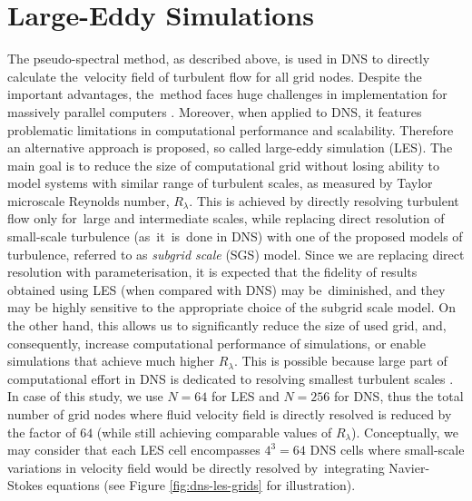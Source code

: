 \documentclass{pracamgren}
\begin{document}
\section{Large-Eddy Simulations}
\label{sc:ch1.les}

The pseudo-spectral method, as described above, is used in DNS to directly calculate the~velocity field of turbulent flow for all grid nodes.
Despite the important advantages, the~method faces huge challenges in implementation for massively parallel computers \parencite{Onishi2013}. 
Moreover, when applied to DNS, it features problematic limitations in computational performance and scalability. 
Therefore an alternative approach is proposed, so called large-eddy simulation (LES). 
The main goal is to reduce the size of computational grid without losing ability to model systems with similar range of turbulent scales, as measured by Taylor microscale Reynolds number, $R_{\lambda}$.
This is achieved by directly resolving turbulent flow only for~large and intermediate scales, while replacing direct resolution of small-scale turbulence (as~it~is~done in DNS) with one of the proposed models of turbulence, referred to as \emph{subgrid scale} (SGS) model.
Since we are replacing direct resolution with parameterisation, it is expected that the fidelity of results obtained using LES (when compared with DNS) may be~diminished, and they may be highly sensitive to the appropriate choice of the subgrid scale model.
On the other hand, this allows us to significantly reduce the size of used grid, and, consequently, increase computational performance of simulations, or enable simulations that achieve much higher $R_{\lambda}$.
This is possible because large part of computational effort in DNS is dedicated to resolving smallest turbulent scales \parencite[p. 558]{Pope2000}.
In case of this study, we use $N=64$ for LES and $N=256$ for DNS, thus the total number of grid nodes where fluid velocity field is directly resolved is reduced by the factor of $64$ (while still achieving comparable values of $R_{\lambda}$).
Conceptually, we may consider that each LES cell encompasses $4^3=64$ DNS cells where small-scale variations in velocity field would be directly resolved by~integrating Navier-Stokes equations (see Figure \ref{fig:dns-les-grids} for illustration).
\end{document}
